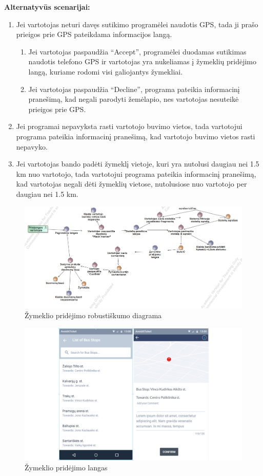 \documentclass{VUMIFPSkursinis}
\begin{document}
	\textbf{Alternatyvūs scenarijai:}
	\begin{enumerate}[itemsep=-2mm]
		\item Jei vartotojas neturi davęs sutikimo programėlei naudotis GPS, tada ji prašo prieigos prie GPS pateikdama informacijos langą. 
		\begin{enumerate}[itemsep=-2mm]
			\item Jei vartotojas paspaudžia “Accept”, programėlei duodamas sutikimas naudotis telefono GPS ir vartotojas yra nukeliamas į žymeklių pridėjimo langą, kuriame rodomi visi galiojantys žymekliai.
			\item Jei vartotojas paspaudžia “Decline”, programa pateikia informacinį pranešimą, kad negali parodyti žemėlapio, nes vartotojas nesuteikė prieigos prie GPS.
		\end{enumerate} 
		\item Jei programai nepavyksta rasti vartotojo buvimo vietos, tada vartotojui programa pateikia informacinį pranešimą, kad vartotojo buvimo vietos rasti nepavyko.
		\item Jei vartotojas bando padėti žymeklį vietoje, kuri yra nutolusi daugiau nei 1.5 km nuo vartotojo, tada vartotojui programa pateikia informacinį pranešimą, kad vartotojas negali dėti žymeklių vietose, nutolusiose nuo vartotojo per daugiau nei 1.5 km.
	\end{enumerate} 
		\begin{figure}[H]
				\centering
				\includegraphics[scale=0.5]{img/zymeklio_pridejimas}
				\caption{Žymeklio pridėjimo robustiškumo diagrama}
				\label{img:Žymeklio pridėjimo langas RD}
			\end{figure}
	\begin{figure}[H]
				\centering
				\includegraphics[scale=0.2]{img/mockup_AddMarker}
				\caption{Žymeklio pridėjimo langas}
				\label{img:Žymeklio pridėjimo langas}
			\end{figure}
\end{document}

